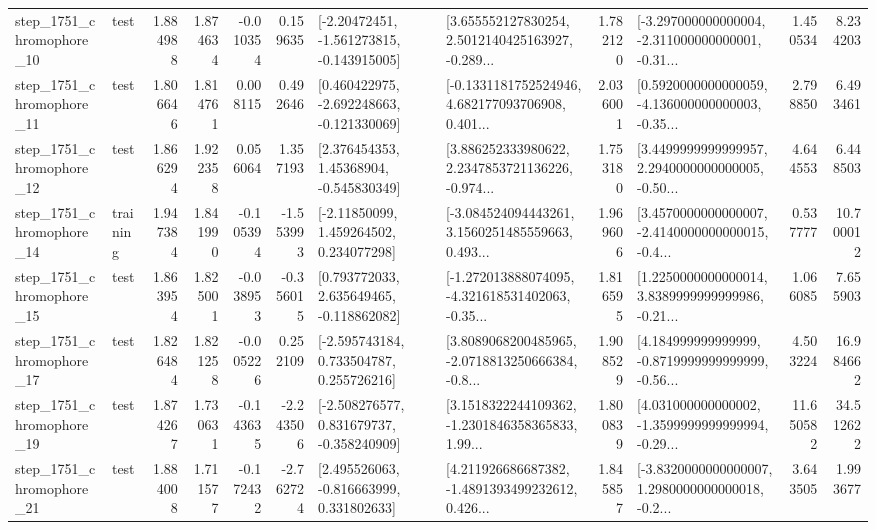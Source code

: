 \begin{tabular}{llrrrrllrlrr}
 step\_1751\_chromophore\_10 &      test &      1.884988 &    1.874634 &     -0.010354 &  0.159635 &   [-2.20472451, -1.561273815, -0.143915005] &  [3.655552127830254, 2.5012140425163927, -0.289... &       1.782120 &  [-3.297000000000004, -2.311000000000001, -0.31... &            1.450534 &          8.234203 \\
 step\_1751\_chromophore\_11 &      test &      1.806646 &    1.814761 &      0.008115 &  0.492646 &   [0.460422975, -2.692248663, -0.121330069] &  [-0.1331181752524946, 4.682177093706908, 0.401... &       2.036001 &  [0.5920000000000059, -4.136000000000003, -0.35... &            2.798850 &          6.493461 \\
 step\_1751\_chromophore\_12 &      test &      1.866294 &    1.922358 &      0.056064 &  1.357193 &     [2.376454353, 1.45368904, -0.545830349] &  [3.886252333980622, 2.2347853721136226, -0.974... &       1.753180 &  [3.4499999999999957, 2.2940000000000005, -0.50... &            4.644553 &          6.448503 \\
 step\_1751\_chromophore\_14 &  training &      1.947384 &    1.841990 &     -0.105394 & -1.553993 &     [-2.11850099, 1.459264502, 0.234077298] &  [-3.084524094443261, 3.1560251485559663, 0.493... &       1.969606 &  [3.4570000000000007, -2.4140000000000015, -0.4... &            0.537777 &         10.700012 \\
 step\_1751\_chromophore\_15 &      test &      1.863954 &    1.825001 &     -0.038953 & -0.356015 &    [0.793772033, 2.635649465, -0.118862082] &  [-1.272013888074095, -4.321618531402063, -0.35... &       1.816595 &  [1.2250000000000014, 3.8389999999999986, -0.21... &            1.066085 &          7.655903 \\
 step\_1751\_chromophore\_17 &      test &      1.826484 &    1.821258 &     -0.005226 &  0.252109 &    [-2.595743184, 0.733504787, 0.255726216] &  [3.8089068200485965, -2.0718813250666384, -0.8... &       1.908529 &  [4.184999999999999, -0.8719999999999999, -0.56... &            4.503224 &         16.984662 \\
 step\_1751\_chromophore\_19 &      test &      1.874267 &    1.730631 &     -0.143635 & -2.243506 &   [-2.508276577, 0.831679737, -0.358240909] &  [3.1518322244109362, -1.2301846358365833, 1.99... &       1.800839 &  [4.031000000000002, -1.3599999999999994, -0.29... &           11.650582 &         34.512622 \\
 step\_1751\_chromophore\_21 &      test &      1.884008 &    1.711577 &     -0.172432 & -2.762724 &    [2.495526063, -0.816663999, 0.331802633] &  [4.211926686687382, -1.4891393499232612, 0.426... &       1.845857 &  [-3.8320000000000007, 1.2980000000000018, -0.2... &            3.643505 &          1.993677 \\

\end{tabular}
